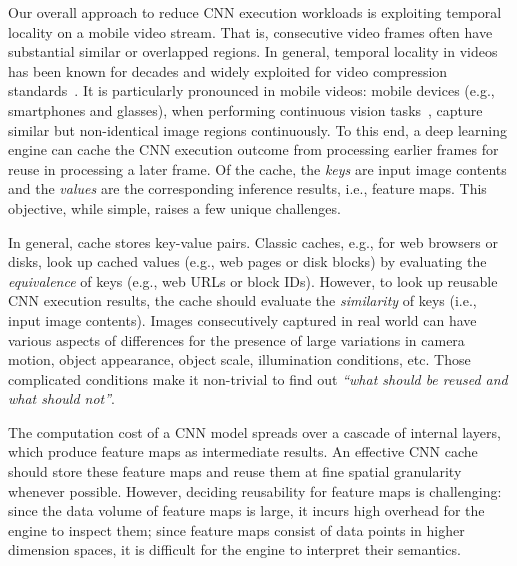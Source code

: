 \documentclass[10pt,acmtog]{acmart}
\newcommand{\variation}{scene variations\xspace}
\begin{document}
Our overall approach to reduce CNN execution workloads is exploiting temporal locality on a mobile video stream.
That is, consecutive video frames often have substantial similar or overlapped regions.
In general, temporal locality in videos has been known for decades and widely exploited for video compression standards~\cite{le1991mpeg,richardson2004h}.
It is particularly pronounced in mobile videos: mobile devices (e.g., smartphones and glasses), when performing continuous vision tasks~\cite{conf/mobisys/LocLB17,conf/sensys/ChenRDBB15}, capture similar but non-identical image regions continuously. 
To this end, a deep learning engine can cache the CNN execution outcome from processing earlier frames for reuse in processing a later frame.
Of the cache, the \textit{keys} are input image contents and the \textit{values} are the corresponding inference results, i.e., feature maps. 
This objective, while simple, raises a few unique challenges.

In general, cache stores key-value pairs. 
Classic caches, e.g., for web browsers or disks, look up cached values (e.g., web pages or disk blocks) by evaluating the \textit{equivalence} of keys (e.g., web URLs or block IDs). 
However, to look up reusable CNN execution results, the cache should evaluate the \textit{similarity} of keys (i.e., input image contents). 
Images consecutively captured in real world can have various aspects of differences for the presence of large variations in camera motion, object appearance, object scale, illumination conditions, etc. Those complicated conditions make it non-trivial to find out \emph{``what should be reused and what should not''}.

The computation cost of a CNN model spreads over a cascade of internal layers, which produce feature maps as intermediate results. 
An effective CNN cache should store these feature maps and reuse them at fine spatial granularity whenever possible. 
However, deciding reusability for feature maps is challenging: 
since the data volume of feature maps is large, it incurs high overhead for the engine to inspect them; 
since feature maps consist of data points in higher dimension spaces, 
it is difficult for the engine to interpret their semantics. 
\end{document}
